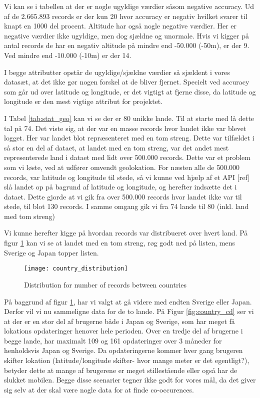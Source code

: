 Vi kan se i tabellen at der er nogle ugyldige værdier såsom negative accuracy. Ud af de 2.665.893 records er der kun 20 hvor accuracy er negativ hvilket svarer til knapt en 1000 del procent. Altitude har også nogle negative værdier. Her er negative værdier ikke ugyldige, men dog sjældne og unormale. Hvis vi kigger på antal records de har en negativ altitude på mindre end -50.000 (-50m), er der 9. Ved mindre end -10.000 (-10m) er der 14.

I begge attributter opstår de ugyldige/sjældne værdier så sjældent i vores datasæt, at det ikke gør nogen forskel at de bliver fjernet. Specielt ved accuracy som går ud over latitude og longitude, er det vigtigt at fjerne disse, da latitude og longitude er den mest vigtige attribut for projektet. 

I Tabel \ref{tab:stat_geo} kan vi se der er 80 unikke lande. Til at starte med lå dette tal på 74. Det viste sig, at der var en masse records hvor landet ikke var blevet logget. Her var landet blot repræsenteret med en tom streng. Dette var tilfældet i så stor en del af dataet, at landet med en tom streng, var det andet mest representerede land i dataet med lidt over 500.000 records. 
Dette var et problem som vi løste, ved at udfører omvendt geolokation. For næsten alle de 500.000 records, var latitude og longitude til stede, så vi kunne ved hjælp af et API [ref] slå landet op på bagrund af latitude og longitude, og herefter indsætte det i dataet. 
Dette gjorde at vi gik fra over 500.000 records hvor landet ikke var til stede, til blot 130 records. I samme omgang gik vi fra 74 lande til 80 (inkl. land med tom streng)



Vi kunne herefter kigge på hvordan records var distribueret over hvert land. På figur \ref{fig:country_dist} kan vi se at landet med en tom streng, røg godt ned på listen, mens Sverige og Japan topper listen. 
\begin{figure}[H]
    \centering
    \texttt{[image: country\_distribution]}
    \caption{Distribution for number of records between countries}
    \label{fig:country_dist}
\end{figure}

På baggrund af figur \ref{fig:country_dist}, har vi valgt at gå videre med endten Sverige eller Japan. Derfor vil vi nu sammeligne data for de to lande. 
På Figur \ref{fig:country_cd} ser vi at der er en stor del af brugerne både i Japan og Sverige, som har meget få lokations opdateringer henover hele perioden. Over en tredje del af brugerne i begge lande, har maximalt 109 og 161 opdateringer over 3 måneder for henholdsvis Japan og Sverige. Da opdateringerne kommer hver gang brugeren skifter lokation (latitude/longitude skifter- hvor mange meter er det egentligt?), betyder dette at mange af brugerene er meget stillestående eller også har de slukket mobilen. Begge disse scenarier tegner ikke godt for vores mål, da det giver sig selv at der skal være nogle data for at finde co-occurences. 

